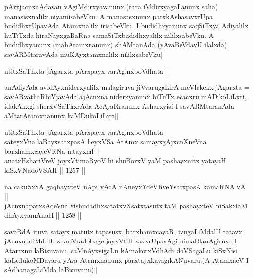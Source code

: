 \begin{artha}
pArxjacnxnAdavan vAgiMdirxyavanunx (tara iMdirxyagaLanunx saha) manasisxnalilx niyamisabeVku. A manasasxnunx parxkAshasavxrUpa budidhxrUpavAda Atamxnalilx irisabeVku. I budidhxyanunx saqSiTxya Adiyalilx huTiTxda hiraNayxgaBaRna samaSiTxbudidhxyalilx nililxsabeVku. A budidhxyanunx (mahAtamxnanunx) shAMtanAda (yAvaBeVdavU ilalxda) savARMtaravAda muKAyxtamxnalilx nililxsabeVku||
\end{artha}


\begin{shl}
utitxSaThxta jAgarxta pArxpayx varAginxboVdhata || 
\end{shl}

\begin{artha}
anAdiyAda avidAyxniderxyalilx malagiruva jiVvarugaLirA meVlakekx jAgarxta = savARvathaRbiVjavAda ajAcnxna niderxyanunx biTuTx ecacxru mADikoLiLxri, idakAkxgi sherxVSaThxrAda AcAyaRranunx Asharxyisi I savARMtaranAda aMtarAtamxnanunx kaMDukoLiLxri||
\end{artha}


\begin{shl}
utitxSaThxta jAgarxta pArxpayx varAginxboVdhata || \\
sateyxVna laBayxsatxpasA heyxVSa AtAmx samayxgAjxcnXneVna barxhamxcayeVRNa nitayxmf || \\
anatxHshariVreV joyxVtimaRyoV hi shuBorxV yaM pashayxnitx yatayaH kiSxVNadoVSAH ||  1257 ||  
\end{shl}

\begin{shl}
na cakuSxSA gaqhayxteV nApi vAcA nAneyxYdeVRveYsatxpasA kamaRNA vA || \\
jAcnxnaparxsAdeVna vishudadhxsatatxvXsatxtasutx taM pashayxteV niSakxlaM dhAyxyamAnaH ||  1258 ||  
\end{shl}

\begin{artha}
savaRdA iruva satayx matutx tapasusx, barxhamxcayaR, ivugaLiMdalU tatavx jAcnxnadiMdalU shariVradoLage joyxVtiH savxrUpavAgi nimaRlanAgiruva I Atamxnu laBisuvanu, saMnAyxsigaLu kAmakorxVdhAdi doVSagaLu kiSxNisi kaLedukoMDavaru yAva Atamxnanunx parxtayxkavagikANuvaru.(A AtamxneV I sAdhanagaLiMda laBisuvanu)||
\end{artha}

